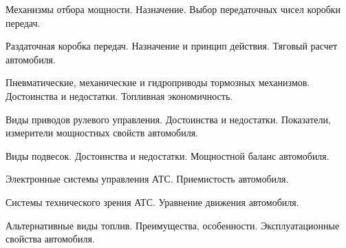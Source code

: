 \documentclass[
	14pt,
	a4paper,
	]
	{scrartcl}
\begin{document}
\vfill
\z Механизмы отбора мощности. Назначение.
 \vfill
\z Выбор передаточных чисел коробки передач.
 \vfill

\vfill

\newpage


\shapk
{}
\setcounter{zad}{0}

\vfill
\z Раздаточная коробка передач. Назначение и принцип действия.
 \vfill
\z Тяговый расчет автомобиля.
 \vfill

\vfill

\newpage


\shapk
{}
\setcounter{zad}{0}

\vfill
\z Пневматические, механические и гидроприводы тормозных механизмов. Достоинства и недостатки.
 \vfill
\z Топливная экономичность.
 \vfill

\vfill

\newpage


\shapk
{}
\setcounter{zad}{0}

\vfill
\z Виды приводов рулевого управления. Достоинства и недостатки.
 \vfill
\z Показатели, измерители мощностных свойств автомобиля.
 \vfill

\vfill

\newpage


\shapk
{}
\setcounter{zad}{0}

\vfill
\z Виды подвесок. Достоинства и недостатки.
 \vfill
\z Мощностной баланс автомобиля.
 \vfill

\vfill

\newpage


\shapk
{}
\setcounter{zad}{0}

\vfill
\z Электронные системы управления АТС.
 \vfill
\z Приемистость автомобиля.
 \vfill

\vfill

\newpage


\shapk
{}
\setcounter{zad}{0}

\vfill
\z Системы технического зрения АТС.
 \vfill
\z Уравнение движения автомобиля.
 \vfill

\vfill

\newpage


\shapk
{}
\setcounter{zad}{0}

\vfill
\z Альтернативные виды топлив. Преимущества, особенности.
 \vfill
\z Эксплуатационные свойства автомобиля.
 \vfill
\end{document}
